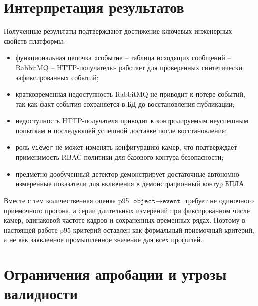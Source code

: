 \section{Интерпретация результатов}

Полученные результаты подтверждают достижение ключевых инженерных свойств платформы:
\begin{itemize}
    \item функциональная цепочка «событие -- таблица исходящих сообщений -- RabbitMQ -- HTTP-получатель» работает для проверенных синтетически зафиксированных событий;
    \item кратковременная недоступность RabbitMQ не приводит к потере событий, так как факт события сохраняется в БД до восстановления публикации;
    \item недоступность HTTP-получателя приводит к контролируемым неуспешным попыткам и последующей успешной доставке после восстановления;
    \item роль \texttt{viewer} не может изменять конфигурацию камер, что подтверждает применимость RBAC-политики для базового контура безопасности;
    \item предметно дообученный детектор демонстрирует достаточные автономно измеренные показатели для включения в демонстрационный контур БПЛА.
\end{itemize}

Вместе с тем количественная оценка p95 \(\texttt{object}\rightarrow\texttt{event}\) требует не одиночного приемочного прогона, а серии длительных измерений при фиксированном числе камер, одинаковой частоте кадров и сохраненных временных рядах. Поэтому в настоящей работе p95-критерий оставлен как формальный приемочный критерий, а не как заявленное промышленное значение для всех профилей.

\section{Ограничения апробации и угрозы валидности}

